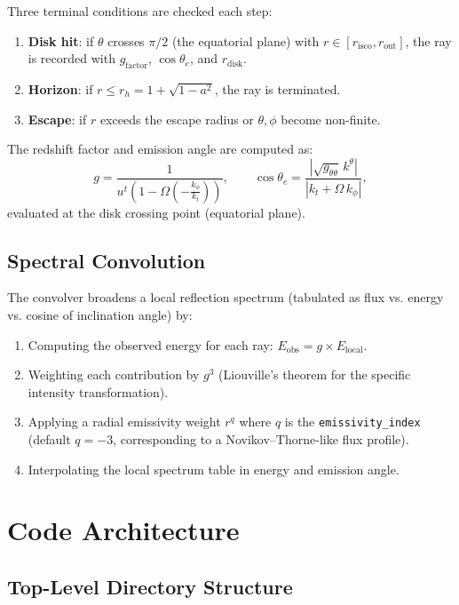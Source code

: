 \documentclass[11pt,twoside]{article}
\begin{document}
Three terminal conditions are checked each step:
\begin{enumerate}
\item \textbf{Disk hit}: if $\theta$ crosses $\pi/2$ (the equatorial plane) with
$r \in [r_{\text{isco}}, r_{\text{out}}]$, the ray is recorded with
$g_{\text{factor}}$, $\cos\theta_e$, and $r_{\text{disk}}$.
\item \textbf{Horizon}: if $r \leq r_h = 1 + \sqrt{1 - a^2}$, the ray is terminated.
\item \textbf{Escape}: if $r$ exceeds the escape radius or $\theta, \phi$ become
non-finite.
\end{enumerate}

The redshift factor and emission angle are computed as:
\begin{equation}
g = \frac{1}{u^t\left(1 - \Omega\left(-\frac{k_\phi}{k_t}\right)\right)},
\qquad \cos\theta_e = \frac{\left|\sqrt{g_{\theta\theta}}\,k^\theta\right|}{|k_t + \Omega\,k_\phi|},
\end{equation}
evaluated at the disk crossing point (equatorial plane).

\subsection{Spectral Convolution}
The convolver broadens a local reflection spectrum (tabulated as
flux vs. energy vs. cosine of inclination angle) by:
\begin{enumerate}
\item Computing the observed energy for each ray: $E_{\text{obs}} = g \times E_{\text{local}}$.
\item Weighting each contribution by $g^3$ (Liouville's theorem for the specific
intensity transformation).
\item Applying a radial emissivity weight $r^q$ where $q$ is the
\texttt{emissivity\_index} (default $q = -3$, corresponding to a
Novikov--Thorne-like flux profile).
\item Interpolating the local spectrum table in energy and emission angle.
\end{enumerate}

\section{Code Architecture}
\label{sec:architecture}

\subsection{Top-Level Directory Structure}
\end{document}
